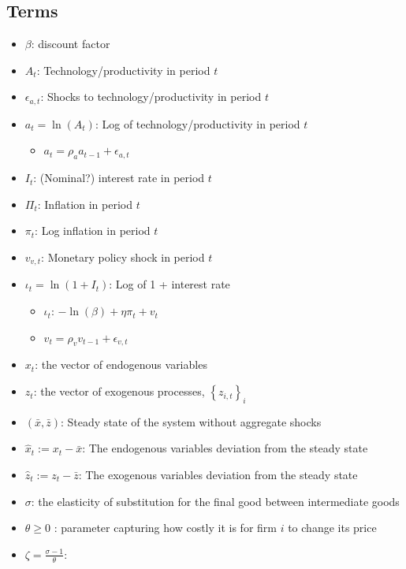 \documentclass[10pt]{article}
\begin{document}
\subsection{Terms}

\begin{itemize}
    \item $\beta$: discount factor
    \item $A_t$: Technology/productivity in period $t$
    \item $\epsilon_{a,t}$: Shocks to technology/productivity in period $t$
    \item $a_t = \ln(A_t)$: Log of technology/productivity in period $t$
        \begin{itemize}
            \item $a_t = \rho_a a_{t-1} + \epsilon_{a,t}$
        \end{itemize}
    \item $I_t$: (Nominal?) interest rate in period $t$
    \item $\Pi_t$: Inflation in period $t$
    \item $\pi_t$: Log inflation in period $t$
    \item $v_{v,t}$: Monetary policy shock in period $t$
    \item $\iota_t = \ln(1 + I_t)$: Log of 1 + interest rate
        \begin{itemize}
            \item $\iota_t$: $-\ln(\beta) + \eta \pi_t + v_t$
            \item $v_t = \rho_v v_{t-1} + \epsilon_{v,t}$
        \end{itemize}
    \item $x_t$: the vector of endogenous variables
    \item $z_t$: the vector of exogenous processes, $\left\{z_{i, t}\right\}_i$
    \item $(\bar{x}, \bar{z})$: Steady state of the system without aggregate shocks
    \item $\hat{x}_t:=x_t-\bar{x}$: The endogenous variables deviation from the steady state 
    \item $\hat{z}_t:=z_t-\bar{z}$: The exogenous variables deviation from the steady state
    \item $\sigma$: the elasticity of substitution for the final good between intermediate goods
    \item $\theta \geq 0$ : parameter capturing how costly it is for firm $i$ to change its price
    \item $\zeta = \frac{\sigma-1}{\theta}$: 
\end{itemize}
\end{document}

